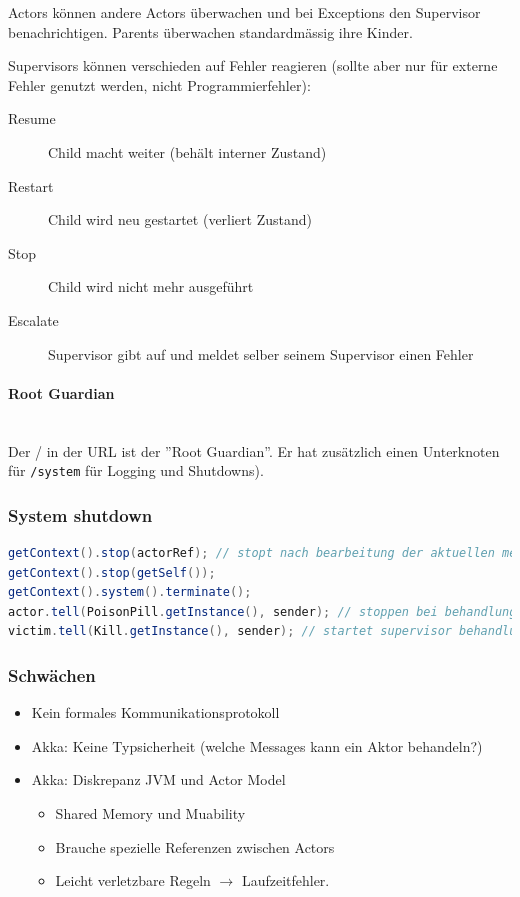 Actors können andere Actors überwachen und bei Exceptions den Supervisor benachrichtigen. Parents überwachen standardmässig ihre Kinder.

Supervisors können verschieden auf Fehler reagieren (sollte aber nur für externe Fehler genutzt werden, nicht Programmierfehler):
\begin{description}
	\item[Resume] Child macht weiter (behält interner Zustand)
	\item[Restart] Child wird neu gestartet (verliert Zustand)
	\item[Stop] Child wird nicht mehr ausgeführt
	\item[Escalate] Supervisor gibt auf und meldet selber seinem Supervisor einen Fehler
\end{description}

\paragraph{Root Guardian} \hfill \\
Der / in der URL ist der ''Root Guardian''. Er hat zusätzlich einen Unterknoten für \lstinline|/system| für Logging und Shutdowns).

\subsubsection{System shutdown}

\begin{lstlisting}[language=java]
getContext().stop(actorRef); // stopt nach bearbeitung der aktuellen message
getContext().stop(getSelf());
getContext().system().terminate();
actor.tell(PoisonPill.getInstance(), sender); // stoppen bei behandlung der Poison Pill
victim.tell(Kill.getInstance(), sender); // startet supervisor behandlung
\end{lstlisting}


\subsubsection{Schwächen}

\begin{itemize}
	\item Kein formales Kommunikationsprotokoll
	\item Akka: Keine Typsicherheit (welche Messages kann ein Aktor behandeln?)
	\item Akka: Diskrepanz JVM und Actor Model \begin{itemize}
		\item Shared Memory und Muability
		\item Brauche spezielle Referenzen zwischen Actors
		\item Leicht verletzbare Regeln $\rightarrow$ Laufzeitfehler.
	\end{itemize}
\end{itemize}

